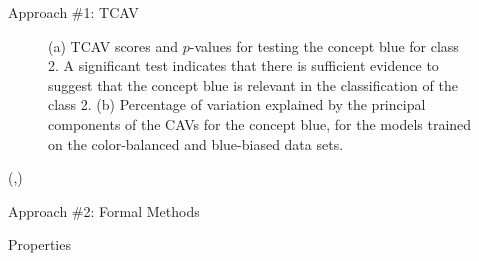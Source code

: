 \documentclass[final]{beamer}
\begin{document}
\begin{frame}[fragile]{}
\begin{textblock}{\colwidth}
\begin{paddedBlock}{Approach \#1: TCAV}
\begin{figure}%
    \centering
    \qquad
    \qquad
    \caption{\textcolor{cardinal}{(a)} TCAV scores and $p$-values for testing the concept blue for class 2. A significant test indicates that there is sufficient evidence to suggest that the concept blue is relevant in the classification of the class 2. \textcolor{cardinal}{(b)} Percentage of variation explained by the principal components of the CAVs for the concept blue, for the models trained on the color-balanced and blue-biased data sets.}%
    \label{fig:example}%
\end{figure}

\end{paddedBlock}
\end{textblock}


\begin{textblock}{\colwidth}(\thirdcolpos,\vstartCols)




\begin{paddedBlock}{Approach \#2: Formal Methods}

\alert{Properties}


\end{paddedBlock}
\end{textblock}
\end{frame}
\end{document}
